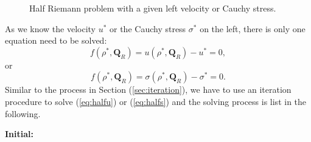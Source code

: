 \documentclass{article}
\numberwithin{equation}{section}
\numberwithin{table}{section}
\begin{document}
\begin{figure}
  \centering
  \caption{Half Riemann problem  with a given left velocity or Cauchy stress.}
  \label{fig:half}
\end{figure}

As we know the velocity $u^*$ or the Cauchy stress $\sigma ^*$ on the left, there is only one equation need to be solved:
\begin{equation}\label{eq:halfu}
  f(\rho^*,\mathbf{Q}_R) =u(\rho^*,\mathbf{Q}_R) - u^* = 0,
\end{equation}
or
\begin{equation}\label{eq:halfs}
  f(\rho^*,\mathbf{Q}_R) =\sigma(\rho^*,\mathbf{Q}_R) - \sigma^* = 0.
\end{equation}
Similar to the process in Section (\ref{sec:iteration}), we have to use an iteration procedure to solve (\ref{eq:halfu}) or (\ref{eq:halfs}) and
the solving process is list in the following.

\noindent  \textbf{Initial:}
\end{document}
